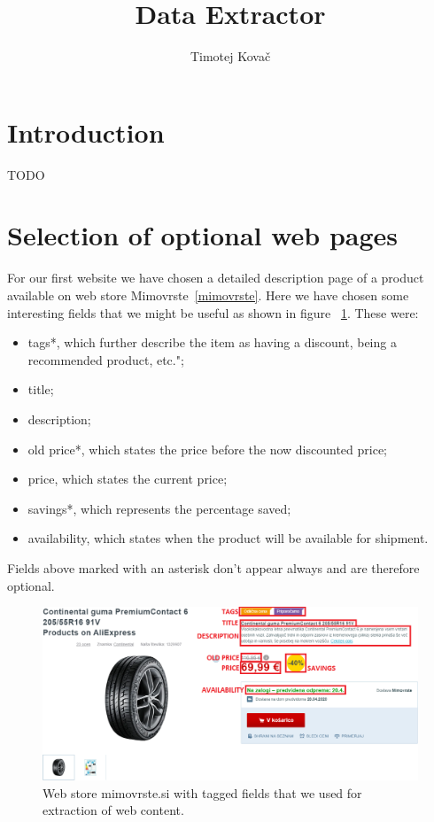 \documentclass[9pt]{IEEEtran}
\title{\vspace{0ex}
Data Extractor}
\author{Timotej Kovač\vspace{-4.0ex}}
\begin{document}
\maketitle

\section{Introduction}

TODO

\section{Selection of optional web pages}

For our first website we have chosen a detailed description page of a product available on web store Mimovrste~\ref{mimovrste}.
Here we have chosen some interesting fields that we might be useful as shown in figure ~\ref{fig_mimovrste}.
These were:
\begin{itemize}
\item{tags*, which further describe the item as having a discount, being a recommended product, etc.";}
\item{title;}
\item{description;}
\item{old price*, which states the price before the now discounted price;}
\item{price, which states the current price;}
\item{savings*, which represents the percentage saved;}
\item{availability, which states when the product will be available for shipment.}
\end{itemize}
Fields above marked with an asterisk don't appear always and are therefore optional.

\begin{figure}[ht]
    \centering
    \includegraphics[width=1\columnwidth]{mimovrste.png}
    \caption{Web store mimovrste.si with tagged fields that we used for extraction of web content.}
    \label{fig_mimovrste}
\end{figure}
\end{document}

